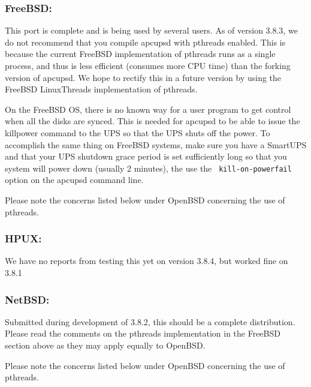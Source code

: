 \label{FreeBSD}

\subsubsection*{FreeBSD:}

\label{index-FreeBSD-36}
\label{index-OS_002c-FreeBSD-37}
This port is complete and is being used by several users. As of version 3.8.3,
we do not recommend that you compile apcupsd with pthreads enabled. This is
because the current FreeBSD implementation of pthreads runs as a single
process, and thus is less efficient (consumes more CPU time) than the forking
version of apcupsd. We hope to rectify this in a future version by using the
FreeBSD LinuxThreads implementation of pthreads.  

On the FreeBSD OS, there is no known way for a user program to get control
when all the disks are synced. This is needed for apcupsd to be able to issue
the killpower command to the UPS so that the UPS shuts off the power. To
accomplish the same thing on FreeBSD systems, make sure you have a SmartUPS
and that your UPS shutdown grace period is set sufficiently long so that you
system will power down (usually 2 minutes), the use the {\tt
kill-on-powerfail} option on the apcupsd command line.  

Please note the concerns listed below under OpenBSD concerning the use of
pthreads. 

\label{HPUX}

\subsubsection*{HPUX:}

\label{index-HPUX-38}
\label{index-OS_002c-HPUX-39}
We have no reports from testing this yet on version 3.8.4, but worked fine on
3.8.1 

\label{NetBSD}

\subsubsection*{NetBSD:}

\label{index-NetBSD-40}
\label{index-OS_002c-NetBSD-41}
Submitted during development of 3.8.2, this should be a complete distribution.
Please read the comments on the pthreads implementation in the FreeBSD
section above as they may apply equally to OpenBSD.  

Please note the concerns listed below under OpenBSD concerning the use of
pthreads. 

